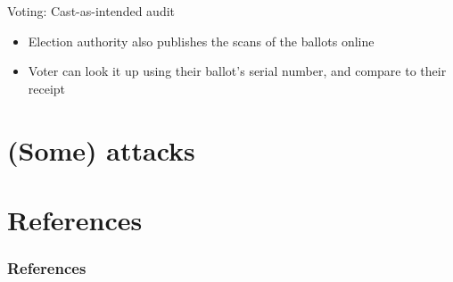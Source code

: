 \documentclass{beamer}
\begin{document}
\begin{frame}{Voting: Cast-as-intended audit}
	\begin{itemize}
		\item Election authority also publishes the scans of the ballots online
		\item Voter can look it up using their ballot's serial number, and compare to their receipt
	\end{itemize}
\end{frame}

\section{(Some) attacks}

\section{References}

\begin{frame}[allowframebreaks]
	\frametitle{References}
	\printbibliography
\end{frame}
\end{document}

